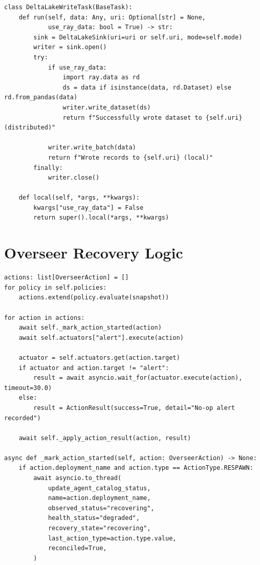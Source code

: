 \documentclass[12pt, a4paper]{report}
\begin{document}
\begin{lstlisting}[caption={Condensed excerpt illustrating the Hybrid Execution Model
used to isolate runtime-sensitive Delta Lake writes.}, label={lst:hybrid_exec}]
class DeltaLakeWriteTask(BaseTask):
    def run(self, data: Any, uri: Optional[str] = None,
            use_ray_data: bool = True) -> str:
        sink = DeltaLakeSink(uri=uri or self.uri, mode=self.mode)
        writer = sink.open()
        try:
            if use_ray_data:
                import ray.data as rd
                ds = data if isinstance(data, rd.Dataset) else rd.from_pandas(data)
                writer.write_dataset(ds)
                return f"Successfully wrote dataset to {self.uri} (distributed)"

            writer.write_batch(data)
            return f"Wrote records to {self.uri} (local)"
        finally:
            writer.close()

    def local(self, *args, **kwargs):
        kwargs["use_ray_data"] = False
        return super().local(*args, **kwargs)
\end{lstlisting}

\section{Overseer Recovery Logic}
\label{app:overseer_code}

\begin{lstlisting}[caption={Condensed excerpt of the Overseer's reconciliation and
deployment recovery path.}, label={lst:overseer_code}]
actions: list[OverseerAction] = []
for policy in self.policies:
    actions.extend(policy.evaluate(snapshot))

for action in actions:
    await self._mark_action_started(action)
    await self.actuators["alert"].execute(action)

    actuator = self.actuators.get(action.target)
    if actuator and action.target != "alert":
        result = await asyncio.wait_for(actuator.execute(action), timeout=30.0)
    else:
        result = ActionResult(success=True, detail="No-op alert recorded")

    await self._apply_action_result(action, result)

async def _mark_action_started(self, action: OverseerAction) -> None:
    if action.deployment_name and action.type == ActionType.RESPAWN:
        await asyncio.to_thread(
            update_agent_catalog_status,
            name=action.deployment_name,
            observed_status="recovering",
            health_status="degraded",
            recovery_state="recovering",
            last_action_type=action.type.value,
            reconciled=True,
        )
\end{lstlisting}
\end{document}
